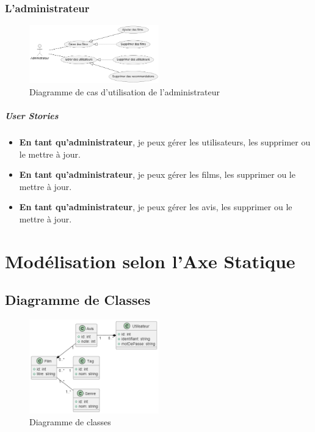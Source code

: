 \documentclass{article}
\begin{document}
\subsubsection{L'administrateur}
\begin{figure}[H]
    \centering
    \includegraphics[width=0.5\textwidth]{images/usecase/admin.png}
    \caption{Diagramme de cas d’utilisation de l’administrateur}
\end{figure}
\subparagraph{User Stories}
\begin{itemize}
    \item \textbf{En tant qu'administrateur}, je peux gérer les utilisateurs, les supprimer ou le mettre à jour.
    \item \textbf{En tant qu'administrateur}, je peux gérer les films, les supprimer ou le mettre à jour.
    \item \textbf{En tant qu'administrateur}, je peux gérer les avis, les supprimer ou le mettre à jour.
\end{itemize}

\section{Modélisation selon l'Axe Statique}
\subsection{Diagramme de Classes}
\begin{figure}[H]
    \centering
    \includegraphics[width=0.5\textwidth]{images/classes/classe.png}
    \caption{Diagramme de classes}
\end{figure}
\end{document}
